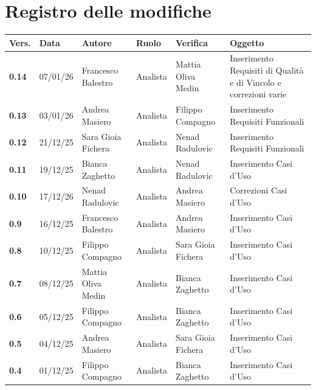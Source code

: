 \documentclass[a4paper,12pt]{article}
\begin{document}
    

    \section*{Registro delle modifiche} {
        \begin{table}[h!]
                \begin{tabularx}{\textwidth}{|l|l|l|l|L|L|}
                \hline
                \textbf{Vers.} & \textbf{Data} & \textbf{Autore} & \textbf{Ruolo} & \textbf{Verifica} & \textbf{Oggetto} \\
                \hline
                \textbf{0.14} & 07/01/26 & Francesco Balestro & Analista & Mattia Oliva Medin & Inserimento Requisiti di Qualità e di Vincolo e correzioni varie \\
                \hline
                \textbf{0.13} & 03/01/26 & Andrea Masiero & Analista & Filippo Compagno & Inserimento Requisiti Funzionali \\
                \hline
                \textbf{0.12} & 21/12/25 &  Sara Gioia Fichera & Analista & Nenad Radulovic & Inserimento Requisiti Funzionali \\
                \hline
                \textbf{0.11} & 19/12/25 & Bianca Zaghetto & Analista & Nenad Radulovic & Inserimento Casi d'Uso \\
                \hline
                \textbf{0.10} & 17/12/26 & Nenad Radulovic & Analista & Andrea Masiero & Correzioni Casi d'Uso \\
                \hline
                \textbf{0.9} & 16/12/25 & Francesco Balestro & Analista & Andrea Masiero & Inserimento Casi d'Uso \\
                \hline
                \textbf{0.8} & 10/12/25 & Filippo Compagno & Analista & Sara Gioia Fichera & Inserimento Casi d'Uso \\
                \hline
                \textbf{0.7} & 08/12/25 & Mattia Oliva Medin & Analista & Bianca Zaghetto & Inserimento Casi d'Uso \\
                \hline
                \textbf{0.6} & 05/12/25 & Filippo Compagno & Analista & Bianca Zaghetto & Inserimento Casi d'Uso \\
                \hline
                \textbf{0.5} & 04/12/25 & Andrea Masiero & Analista & Sara Gioia Fichera & Inserimento Casi d'Uso \\
                \hline
                \textbf{0.4} & 01/12/25 & Filippo Compagno & Analista & Bianca Zaghetto & Inserimento Casi d'Uso \\

\end{tabularx}
\end{table}}
\end{document}
